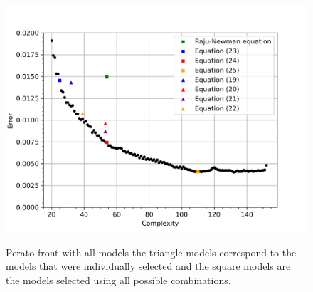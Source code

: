 \begin{figure}
    \centering
    \includegraphics[width=5in]{Figures/perato_front_everything_and_more.png}
    \label{fig:perato_front_everything_ant_more}
    \caption{Perato front with all models the triangle models correspond to the models that were individually selected and the square models are the models selected using all possible combinations.}
\end{figure}

